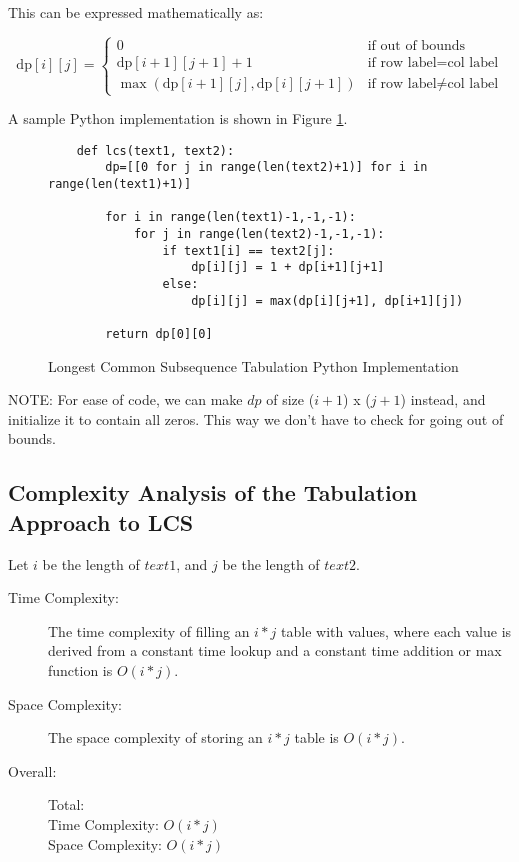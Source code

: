 This can be expressed mathematically as:

\[
\text{dp}[i][j] = 
\begin{cases} 
0 & \text{if out of bounds} \\
\text{dp}[i+1][j+1] + 1 & \text{if } \text{row label} = \text{col label} \\
\max(\text{dp}[i+1][j], \text{dp}[i][j+1]) & \text{if } \text{row label} \neq \text{col label}
\end{cases}
\]


A sample Python implementation is shown in Figure \ref{fig:lcs-dp}.

\begin{figure}[H]
    \centering
    \begin{lstlisting}
    def lcs(text1, text2):
        dp=[[0 for j in range(len(text2)+1)] for i in range(len(text1)+1)]
    
        for i in range(len(text1)-1,-1,-1):
            for j in range(len(text2)-1,-1,-1):
                if text1[i] == text2[j]:
                    dp[i][j] = 1 + dp[i+1][j+1]
                else:
                    dp[i][j] = max(dp[i][j+1], dp[i+1][j])
    
        return dp[0][0]
    \end{lstlisting}
    \caption{Longest Common Subsequence Tabulation Python Implementation}
    \label{fig:lcs-dp}
\end{figure}

NOTE: For ease of code, we can make $dp$ of size ($i+1$) x ($j+1$) instead, and initialize it to contain all zeros. This way we don't have to check for going out of bounds.

\subsection{Complexity Analysis of the Tabulation Approach to LCS}\label{subsec:ca-lcs-dp}

Let $i$ be the length of $text1$, and $j$ be the length of $text2$.

\begin{description}
    \item[Time Complexity:]
        The time complexity of filling an $i * j$ table with values, where each value is derived from a constant time lookup and a constant time addition or max function is $O(i * j)$.

    \item[Space Complexity:] 
        The space complexity of storing an $i * j$ table is $O(i * j)$.

        
    \item[Overall:] Total:\\
        Time Complexity: $O(i * j)$\\
        Space Complexity: $O(i * j)$
    
\end{description}

